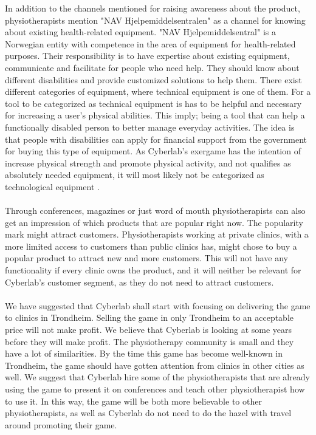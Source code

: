 In addition to the channels mentioned for raising awareness about the product, physiotherapists mention "NAV Hjelpemiddelsentralen" as a channel for knowing about existing health-related equipment. "NAV Hjelpemiddelsentral" is a Norwegian entity with competence in the area of equipment for health-related purposes. Their responsibility is to have expertise about existing equipment, communicate and facilitate for people who need help. They should know about different disabilities and provide customized solutions to help them. There exist different categories of equipment, where technical equipment is one of them. For a tool to be categorized as technical equipment is has to be helpful and necessary for increasing a user’s physical abilities. This imply; being a tool that can help a functionally disabled person to better manage everyday activities. The idea is that people with disabilities can apply for financial support from the government for buying this type of equipment. As Cyberlab’s exergame has the intention of increase physical strength and promote physical activity, and not qualifies as absolutely needed equipment, it will most likely not be categorized as technological equipment \cite{navhjelpemiddel} \cite{navhjelpemiddelsentralen}.  \\ \\ 
Through conferences, magazines or just word of mouth physiotherapists can also get an impression of which products that are popular right now. The popularity mark might attract customers. Physiotherapists working at private clinics, with a more limited access to customers than public clinics has, might chose to buy a popular product to attract new and more customers. This will not have any functionality if every clinic owns the product, and it will neither be relevant for Cyberlab’s customer segment, as they do not need to attract customers. \\ \\ 
We have suggested that Cyberlab shall start with focusing on delivering the game to clinics in Trondheim. Selling the game in only Trondheim to an acceptable price will not make profit. We believe that Cyberlab is looking at some years before they will make profit. The physiotherapy community is small and they have a lot of similarities. By the time this game has become well-known in Trondheim, the game should have gotten attention from clinics in other cities as well. We suggest that Cyberlab hire some of the physiotherapists that are already using the game to present it on conferences and teach other physiotherapist how to use it. In this way, the game will be both more believable to other physiotherapists, as well as Cyberlab do not need to do the hazel with travel around promoting their game. \\ \\
